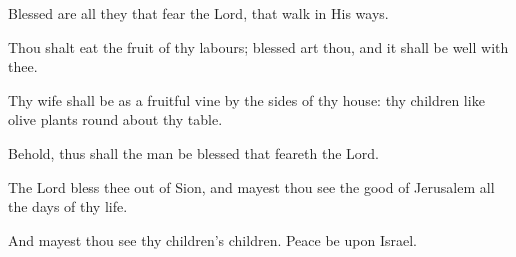 Blessed are all they that fear the Lord, that walk in His ways.

Thou shalt eat the fruit of thy labours; blessed art thou, and it shall be well with thee.

Thy wife shall be as a fruitful vine by the sides of thy house: thy children like olive plants round about thy table.

Behold, thus shall the man be blessed that feareth the Lord.

The Lord bless thee out of Sion, and mayest thou see the good of Jerusalem all the days of thy life.

And mayest thou see thy children's children. Peace be upon Israel.
